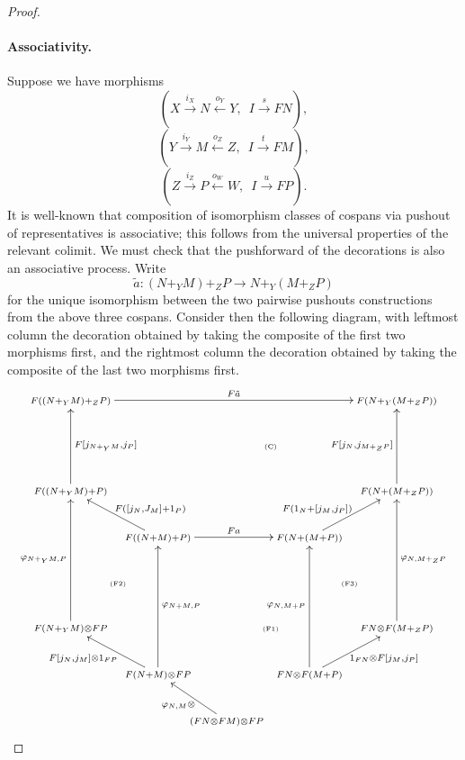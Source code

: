\begin{proof}
\paragraph{Associativity.}
Suppose we have morphisms
\[
  (X \stackrel{i_X}\longrightarrow N \stackrel{o_Y}\longleftarrow Y,\enspace I
  \stackrel{s}\longrightarrow FN),
\]
\[
  (Y \stackrel{i_Y}\longrightarrow M \stackrel{o_Z}\longleftarrow Z,\enspace I
  \stackrel{t}\longrightarrow FM), 
\]
\[
  (Z \stackrel{i_Z}\longrightarrow P \stackrel{o_W}\longleftarrow W,\enspace I
  \stackrel{u}\longrightarrow FP).
\]
It is well-known that composition of isomorphism classes of cospans via
pushout of representatives is associative; this follows from the universal
properties of the relevant colimit. We must check that the pushforward of the
decorations is also an associative process. Write 
\[
  \tilde a\colon  (N+_YM)+_ZP \longrightarrow N+_Y(M+_ZP)
\]
for the unique isomorphism between the two pairwise pushouts constructions
from the above three cospans. Consider then the following diagram, with leftmost
column the decoration obtained by taking the composite of the first two morphisms
first, and the rightmost column the decoration obtained by taking the composite
of the last two morphisms first.
\[
  \xymatrixcolsep{-.58pc}
  \xymatrix{ 
    \scriptstyle F((N+_YM)+_ZP) \ar[rrrrrrrr]^{F\tilde a} &&&&&&&&
    \scriptstyle F(N+_Y(M+_ZP)) \\
    &&&& \textrm{\tiny(C)} \\
    \scriptstyle F((N+_YM)+P) \ar[uu]_{F[j_{N+_YM},j_P]} &&&&&&&& \scriptstyle
    F(N+(M+_ZP)) \ar[uu]^{F[j_N,j_{M+_ZP}]} \\
    && \scriptstyle F((N+M)+P) \ar[ull]_(.35)*+<6pt>_{\scriptstyle F([j_N,J_M]+1_P)}
    \ar[rrrr]^{Fa} &&&& \scriptstyle F(N+(M+P))
    \ar[urr]^(.35)*+<6pt>^{\scriptstyle F(1_N+[j_M,j_P])} \\
    & \textrm{\tiny(F2)} &&&&&& \textrm{\tiny(F3)} \\
    \scriptstyle F(N+_YM)\otimes FP \ar[uuu]^{\varphi_{N+_YM,P}} &&&& 
    \textrm{\tiny(F1)} &&&& \scriptstyle FN\otimes F(M+_ZP)
    \ar[uuu]_{\varphi_{N,M+_ZP}} \\
    && \scriptstyle F(N+M)\otimes FP \ar[ull]^(.6)*+<6pt>^{\scriptstyle
      F[j_N,j_M] \otimes 1_{FP}} \ar[uuu]_{\varphi_{N+M,P}} &&&& \scriptstyle
      FN \otimes F(M+P) \ar[urr]_(.6)*+<6pt>_{\scriptstyle 1_{FN} \otimes
    F[j_M,j_P]} \ar[uuu]^{\varphi_{N,M+P}} \\
    &&& \scriptstyle (FN \otimes FM) \otimes FP \ar[ul]^{\varphi_{N,M} \otimes
}}\]
\end{proof}

